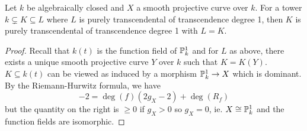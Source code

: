 \begin{corollary}\label{corr: Luroth problem}
    Let $k$ be algebraically closed and $X$ a smooth projective curve over $k$. For a tower $k\subsetneq K\subseteq L$ where $L$ is purely transcendental of transcendence degree 1, then $K$ is purely transcendental of transcendence degree 1 with $L=K$. 
\end{corollary}
\begin{proof}
    Recall that $k(t)$ is the function field of $\mathbb{P}^{1}_{k}$ and for $L$ as above, there exists a unique smooth projective curve $Y$ over $k$ such that $K=K(Y)$. $K\subseteq k(t)$ can be viewed as induced by a morphism $\mathbb{P}^{1}_{k}\to X$ which is dominant. By the Riemann-Hurwitz formula, we have 
    $$-2=\deg(f)(2g_{X}-2)+\deg(R_{f})$$
    but the quantity on the right is $\geq0$ if $g_{X}>0$ so $g_{X}=0$, ie. $X\cong\mathbb{P}^{1}_{k}$ and the function fields are isomorphic. 
\end{proof}